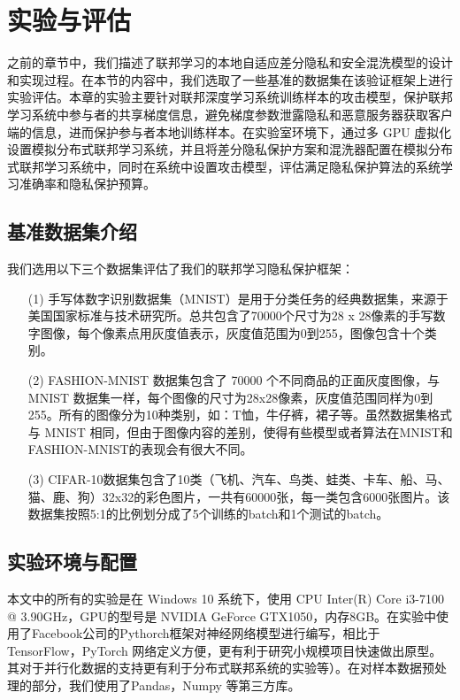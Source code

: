 \chapter{实验与评估}
\label{ch5}
之前的章节中，我们描述了联邦学习的本地自适应差分隐私和安全混洗模型的设计和实现过程。在本节的内容中，我们选取了一些基准的数据集在该验证框架上进行实验评估。本章的实验主要针对联邦深度学习系统训练样本的攻击模型，保护联邦学习系统中参与者的共享梯度信息，避免梯度参数泄露隐私和恶意服务器获取客户端的信息，进而保护参与者本地训练样本。在实验室环境下，通过多 GPU 虚拟化设置模拟分布式联邦学习系统，并且将差分隐私保护方案和混洗器配置在模拟分布式联邦学习系统中，同时在系统中设置攻击模型，评估满足隐私保护算法的系统学习准确率和隐私保护预算。 
\section{基准数据集介绍}
我们选用以下三个数据集评估了我们的联邦学习隐私保护框架：
\begin{enumerate}
	\item [(1)] 手写体数字识别数据集（MNIST）是用于分类任务的经典数据集，来源于美国国家标准与技术研究所。总共包含了70000个尺寸为28 x 28像素的手写数字图像，每个像素点用灰度值表示，灰度值范围为0到255，图像包含十个类别。
	\item [(2)] FASHION-MNIST 数据集包含了 70000 个不同商品的正面灰度图像，与 MNIST 数据集一样，每个图像的尺寸为28x28像素，灰度值范围同样为0到255。所有的图像分为10种类别，如：T恤，牛仔裤，裙子等。虽然数据集格式与 MNIST 相同，但由于图像内容的差别，使得有些模型或者算法在MNIST和FASHION-MNIST的表现会有很大不同。
	\item [(3)] CIFAR-10数据集包含了10类（飞机、汽车、鸟类、蛙类、卡车、船、马、猫、鹿、狗）32x32的彩色图片，一共有60000张，每一类包含6000张图片。该数据集按照5:1的比例划分成了5个训练的batch和1个测试的batch。

\end{enumerate}

\section{实验环境与配置}
本文中的所有的实验是在 Windows 10 系统下，使用 CPU Inter(R) Core i3-7100 @ 3.90GHz，GPU的型号是 NVIDIA GeForce GTX1050，内存8GB。在实验中使用了Facebook公司的Pythorch框架对神经网络模型进行编写，相比于TensorFlow，PyTorch 网络定义方便，更有利于研究小规模项目快速做出原型。其对于并行化数据的支持更有利于分布式联邦系统的实验等）。在对样本数据预处理的部分，我们使用了Pandas，Numpy 等第三方库。

